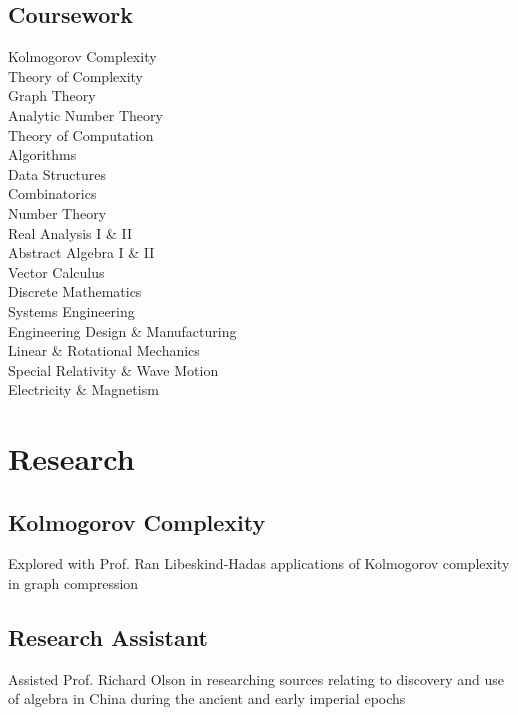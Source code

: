 \documentclass[]{jhearn-resume}
\begin{document}
\begin{minipage}[t]{0.30\textwidth}
\subsection{Coursework}
Kolmogorov Complexity\\
Theory of Complexity\\
Graph Theory\\
Analytic Number Theory\\
Theory of Computation \\
Algorithms \\
Data Structures \\
Combinatorics \\
Number Theory \\
Real Analysis I \& II \\
Abstract Algebra I \& II\\
Vector Calculus\\
Discrete Mathematics\\
Systems Engineering\\
Engineering Design \& Manufacturing\\
Linear \& Rotational Mechanics\\
Special Relativity \& Wave Motion\\
Electricity \& Magnetism\\
\sectionsep

\section{Research}
\subsection{Kolmogorov Complexity}
\small Explored with Prof. Ran Libeskind-Hadas
applications of Kolmogorov complexity in graph compression
\sectionsep 

\subsection{Research Assistant}
\small Assisted Prof. Richard Olson
in researching sources relating to discovery and use of algebra in China during the ancient and early imperial epochs

\end{minipage}
\end{document}
